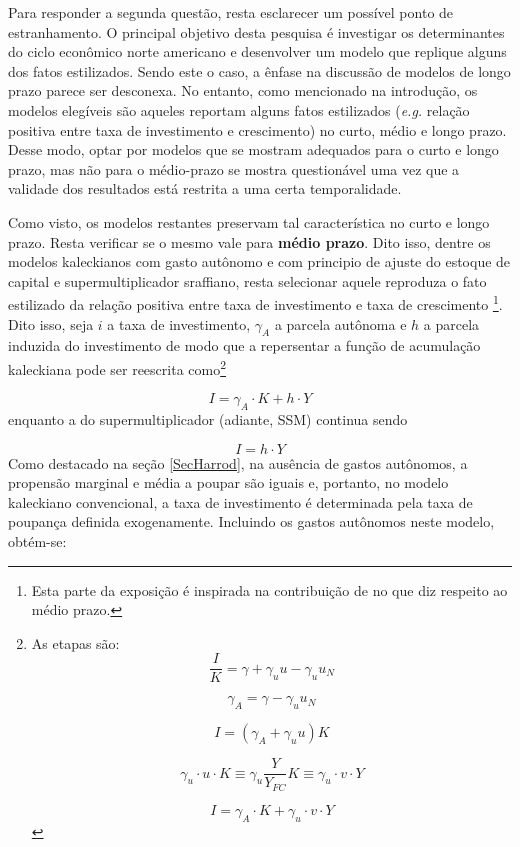 Para responder a segunda questão, resta esclarecer um possível ponto de estranhamento. O principal objetivo desta pesquisa é investigar os determinantes do ciclo econômico norte americano e desenvolver um modelo que replique alguns dos fatos estilizados. Sendo este o caso, a ênfase na discussão de modelos de longo prazo parece ser desconexa. 
No entanto, como mencionado na introdução, os modelos elegíveis são aqueles reportam alguns fatos estilizados (\textit{e.g.} relação positiva entre taxa de investimento e crescimento)  no curto, médio e longo prazo.
Desse modo, optar por modelos que se mostram adequados para o curto e longo prazo, mas não para o médio-prazo se mostra questionável uma vez que a validade dos resultados está restrita a uma certa temporalidade. 

Como visto, os modelos restantes preservam tal característica no curto e longo prazo. Resta verificar se o mesmo vale para \textbf{médio prazo}. Dito isso, dentre os modelos kaleckianos com gasto autônomo e com principio de ajuste do estoque de capital e supermultiplicador sraffiano, resta selecionar aquele reproduza o fato estilizado da relação positiva entre taxa de investimento e taxa de crescimento \cites[p.~172]{cesaratto_neo-kaleckian_2015}[p.~8--9]{fiebiger_trend_2017}\footnote{Esta parte da exposição é inspirada na contribuição de \textcite{fagundes_role_2017} no que diz respeito ao médio prazo.}. Dito isso, seja $i$ a taxa de investimento, $\gamma_A$ a parcela autônoma e $h$ a parcela induzida do investimento de modo que a repersentar a função de acumulação kaleckiana pode ser reescrita como\footnote{
	As etapas são:
	$$
	\frac{I}{K}  = \gamma + \gamma_uu - \gamma_uu_N
	$$
	
	$$
	\gamma_A = \gamma - \gamma_uu_N
	$$
	
	$$
	I = (\gamma_A + \gamma_uu)K
	$$
	
	$$
	\gamma_u\cdot u \cdot K \equiv \gamma_u\frac{Y}{Y_{FC}}K \equiv \gamma_u\cdot v\cdot Y
	$$
	
	$$
	I = \gamma_A\cdot K + \gamma_u\cdot v\cdot Y
	$$
}

\begin{equation}
\tag{kaleckiana}
I = \gamma_A\cdot K + h\cdot Y
\end{equation}
enquanto a do supermultiplicador (adiante, SSM) continua sendo

\begin{equation}
\tag{SSM}
I = h\cdot Y
\end{equation}
Como destacado na seção \ref{SecHarrod}, na ausência de gastos autônomos, a propensão marginal e média a poupar são iguais e, portanto, no modelo kaleckiano convencional, a taxa de investimento é determinada pela taxa de poupança definida exogenamente. Incluindo os gastos autônomos neste modelo, obtém-se:

